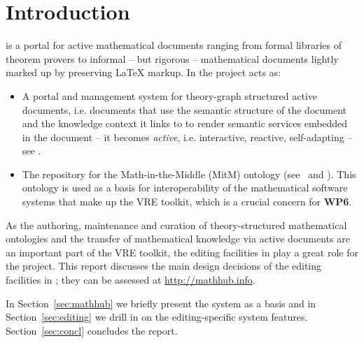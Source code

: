 \section{Introduction}\label{sec:intro}

\sys is a portal for active mathematical documents ranging from formal libraries of
theorem provers to informal -- but rigorous -- mathematical documents lightly marked up by
preserving {\LaTeX} markup. In the \pn project \sys acts as: 
\begin{itemize}
\item A portal and management system for theory-graph structured active documents,
  i.e. documents that use the semantic structure of the document and the knowledge context
  it links to to render semantic services embedded in the document -- it becomes
  \emph{active}, i.e. interactive, reactive, self-adapting --
  see .
\item The repository for the Math-in-the-Middle (MitM) ontology
  (see~\cite{DehKohKon:iop16} and ). This ontology is used as a basis for
  interoperability of the mathematical software systems that make up the \pn VRE toolkit,
  which is a crucial concern for \textbf{WP6}.
\end{itemize}
As the authoring, maintenance and curation of theory-structured mathematical ontologies
and the transfer of mathematical knowledge via active documents are an important part of
the \pn VRE toolkit, the editing facilities in \sys play a great role for the
project. This report discusses the main design decisions of the editing facilities in
\sys; they can be assessed at \url{http://mathhub.info}.

In Section~\ref{sec:mathhub} we briefly present the \sys system as a basis and in
Section~\ref{sec:editing} we drill in on the editing-specific system
features. Section~\ref{sec:concl} concludes the report. 


